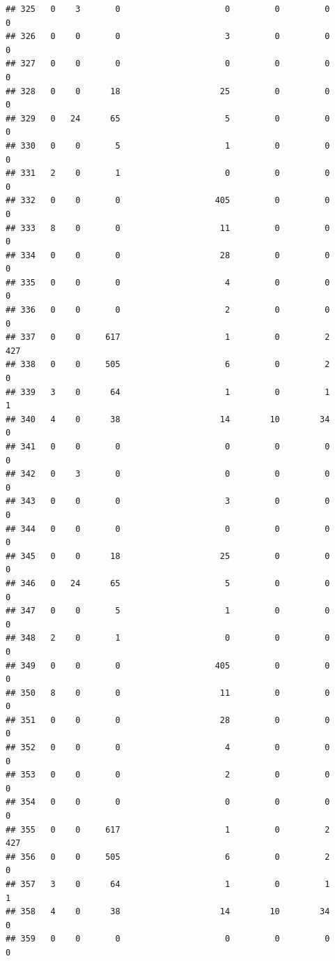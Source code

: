 \documentclass[
]{article}
\begin{document}
\begin{verbatim}
## 325   0    3       0                     0         0         0        0
## 326   0    0       0                     3         0         0        0
## 327   0    0       0                     0         0         0        0
## 328   0    0      18                    25         0         0        0
## 329   0   24      65                     5         0         0        0
## 330   0    0       5                     1         0         0        0
## 331   2    0       1                     0         0         0        0
## 332   0    0       0                   405         0         0        0
## 333   8    0       0                    11         0         0        0
## 334   0    0       0                    28         0         0        0
## 335   0    0       0                     4         0         0        0
## 336   0    0       0                     2         0         0        0
## 337   0    0     617                     1         0         2      427
## 338   0    0     505                     6         0         2        0
## 339   3    0      64                     1         0         1        1
## 340   4    0      38                    14        10        34        0
## 341   0    0       0                     0         0         0        0
## 342   0    3       0                     0         0         0        0
## 343   0    0       0                     3         0         0        0
## 344   0    0       0                     0         0         0        0
## 345   0    0      18                    25         0         0        0
## 346   0   24      65                     5         0         0        0
## 347   0    0       5                     1         0         0        0
## 348   2    0       1                     0         0         0        0
## 349   0    0       0                   405         0         0        0
## 350   8    0       0                    11         0         0        0
## 351   0    0       0                    28         0         0        0
## 352   0    0       0                     4         0         0        0
## 353   0    0       0                     2         0         0        0
## 354   0    0       0                     0         0         0        0
## 355   0    0     617                     1         0         2      427
## 356   0    0     505                     6         0         2        0
## 357   3    0      64                     1         0         1        1
## 358   4    0      38                    14        10        34        0
## 359   0    0       0                     0         0         0        0

\end{verbatim}
\end{document}
